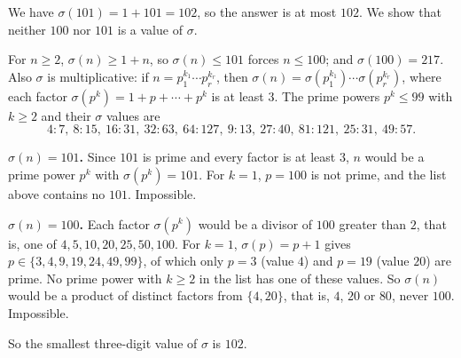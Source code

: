 We have $\sigma(101)=1+101=102$, so the answer is at most $102$. We show that neither $100$ nor $101$ is a value of $\sigma$.

For $n\ge2$, $\sigma(n)\ge1+n$, so $\sigma(n)\le101$ forces $n\le100$; and $\sigma(100)=217$. Also $\sigma$ is multiplicative: if $n=p_1^{k_1}\cdots p_r^{k_r}$, then $\sigma(n)=\sigma\!\left(p_1^{k_1}\right)\cdots\sigma\!\left(p_r^{k_r}\right)$, where each factor $\sigma\!\left(p^k\right)=1+p+\cdots+p^k$ is at least $3$. The prime powers $p^k\le99$ with $k\ge2$ and their $\sigma$ values are
\[4\!:\!7,\ 8\!:\!15,\ 16\!:\!31,\ 32\!:\!63,\ 64\!:\!127,\ 9\!:\!13,\ 27\!:\!40,\ 81\!:\!121,\ 25\!:\!31,\ 49\!:\!57 .\]

\textbf{$\sigma(n)=101$.} Since $101$ is prime and every factor is at least $3$, $n$ would be a prime power $p^k$ with $\sigma\!\left(p^k\right)=101$. For $k=1$, $p=100$ is not prime, and the list above contains no $101$. Impossible.

\textbf{$\sigma(n)=100$.} Each factor $\sigma\!\left(p^k\right)$ would be a divisor of $100$ greater than $2$, that is, one of $4,5,10,20,25,50,100$. For $k=1$, $\sigma(p)=p+1$ gives $p\in\{3,4,9,19,24,49,99\}$, of which only $p=3$ (value $4$) and $p=19$ (value $20$) are prime. No prime power with $k\ge2$ in the list has one of these values. So $\sigma(n)$ would be a product of distinct factors from $\{4,20\}$, that is, $4$, $20$ or $80$, never $100$. Impossible.

So the smallest three-digit value of $\sigma$ is $\boxed{102}$.
